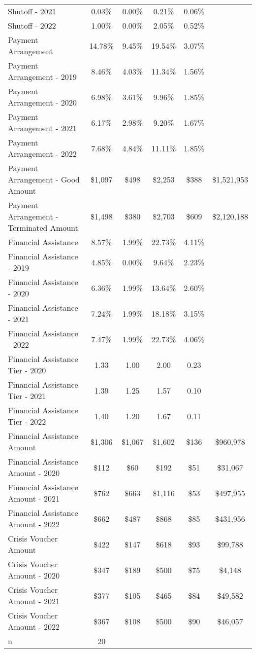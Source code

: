 \begin{tabular}{l|c|c|c|c|c}
\quad Shutoff - 2021 & 0.03\% & 0.00\% & 0.21\% & 0.06\% \\
\quad Shutoff - 2022 & 1.00\% & 0.00\% & 2.05\% & 0.52\% \\
\midrule 
Payment Arrangement & 14.78\% & 9.45\% & 19.54\% & 3.07\% \\
\quad Payment Arrangement - 2019 & 8.46\% & 4.03\% & 11.34\% & 1.56\% \\
\quad Payment Arrangement - 2020 & 6.98\% & 3.61\% & 9.96\% & 1.85\% \\
\quad Payment Arrangement - 2021 & 6.17\% & 2.98\% & 9.20\% & 1.67\% \\
\quad Payment Arrangement - 2022 & 7.68\% & 4.84\% & 11.11\% & 1.85\% \\
\quad Payment Arrangement - Good Amount & \$1,097 & \$498 & \$2,253 & \$388 & \$1,521,953 \\
\quad Payment Arrangement - Terminated Amount & \$1,498 & \$380 & \$2,703 & \$609 & \$2,120,188 \\
\midrule 
Financial Assistance & 8.57\% & 1.99\% & 22.73\% & 4.11\% \\
\quad Financial Assistance - 2019 & 4.85\% & 0.00\% & 9.64\% & 2.23\% \\
\quad Financial Assistance - 2020 & 6.36\% & 1.99\% & 13.64\% & 2.60\% \\
\quad Financial Assistance - 2021 & 7.24\% & 1.99\% & 18.18\% & 3.15\% \\
\quad Financial Assistance - 2022 & 7.47\% & 1.99\% & 22.73\% & 4.06\% \\
\midrule 
Financial Assistance Tier - 2020 & 1.33 & 1.00 & 2.00 & 0.23 \\
Financial Assistance Tier - 2021 & 1.39 & 1.25 & 1.57 & 0.10 \\
Financial Assistance Tier - 2022 & 1.40 & 1.20 & 1.67 & 0.11 \\
\midrule 
Financial Assistance Amount & \$1,306 & \$1,067 & \$1,602 & \$136 & \$960,978 \\
\quad Financial Assistance Amount - 2020 & \$112 & \$60 & \$192 & \$51 & \$31,067 \\
\quad Financial Assistance Amount - 2021 & \$762 & \$663 & \$1,116 & \$53 & \$497,955 \\
\quad Financial Assistance Amount - 2022 & \$662 & \$487 & \$868 & \$85 & \$431,956 \\
\midrule 
Crisis Voucher Amount & \$422 & \$147 & \$618 & \$93 & \$99,788 \\
\quad Crisis Voucher Amount - 2020 & \$347 & \$189 & \$500 & \$75 & \$4,148 \\
\quad Crisis Voucher Amount - 2021 & \$377 & \$105 & \$465 & \$84 & \$49,582 \\
\quad Crisis Voucher Amount - 2022 & \$367 & \$108 & \$500 & \$90 & \$46,057 \\
\midrule 
n & 20 &  &  &  &  \\
\midrule 
\bottomrule 
\end{tabular}
